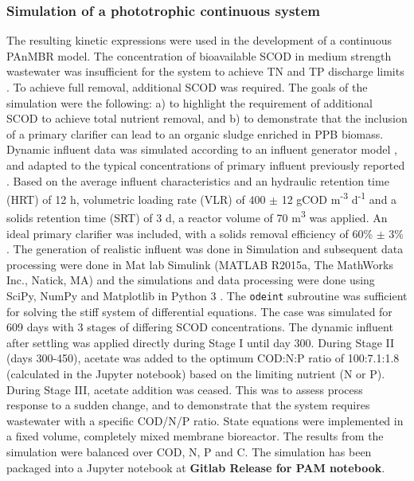 \subsubsection{Simulation of a phototrophic continuous system}
The resulting kinetic expressions were used in the development of a continuous PAnMBR model. The concentration of bioavailable SCOD in medium strength wastewater was insufficient for the system to achieve TN and TP discharge limits \cite{Hulsen2016}. To achieve full removal, additional SCOD was required. The goals of the simulation were the following: a) to highlight the requirement of additional SCOD to achieve total nutrient removal, and b) to demonstrate that the inclusion of a primary clarifier can lead to an organic sludge enriched in PPB biomass. Dynamic influent data was simulated according to an influent generator model \cite{Gernaey2011}, and adapted to the typical concentrations of primary influent previously reported \cite{Hulsen2014}. Based on the average influent characteristics and an hydraulic retention time (HRT) of 12 h, volumetric loading rate (VLR) of 400 $\pm$ 12 gCOD m\textsuperscript{-3} d\textsuperscript{-1} and a solids retention time (SRT) of 3 d, a reactor volume of 70 m\textsuperscript{3} was applied. An ideal primary clarifier was included, with a solids removal efficiency of 60\% $\pm$ 3\% \cite{Tchobanoglous}. The generation of realistic influent was done in Simulation and subsequent data processing were done in Mat
lab Simulink (MATLAB R2015a, The MathWorks Inc., Natick, MA) and the simulations and data processing were done using SciPy, NumPy and Matplotlib in Python 3 \cite{Scipy2001, NumPy2011, Hunter2007a}. The \texttt{odeint} subroutine was sufficient for solving the stiff system of differential equations. The case was simulated for 609 days with 3 stages of differing SCOD concentrations. The dynamic influent after settling was applied directly during Stage I until day
300. During Stage II (days 300-450), acetate was added to the optimum COD:N:P ratio of 100:7.1:1.8 (calculated in the Jupyter notebook) based on the limiting nutrient (N or P). During Stage III, acetate addition was ceased. This was to assess process response to a sudden change, and to demonstrate that the system requires wastewater with a specific COD/N/P ratio. State equations were implemented in a fixed volume, completely mixed membrane bioreactor. The results from the simulation were balanced over COD, N, P and C. The simulation has been packaged into a Jupyter notebook at \textbf{Gitlab Release for PAM notebook}.


